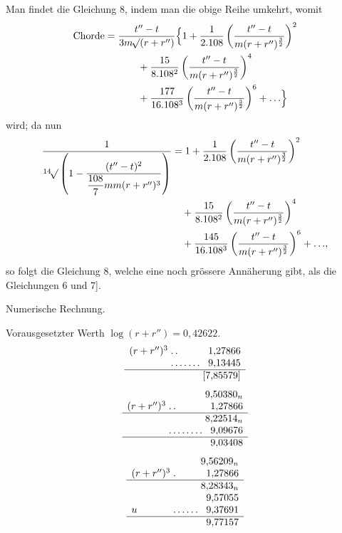 Man findet die Gleichung 8, indem man die obige Reihe umkehrt, womit
\[
\begin{aligned}
\text{Chorde}={}&\frac{t''-t}{3m\BareRoot{(r+r'')}}\Bigl\{1+\frac{1}{2\mathord{.}108}\left(\frac{t''-t}{m(r+r'')^{\frac{3}{2}}}\right)^2\\
&\qquad{}+\frac{15}{8\mathord{.}108^2}\left(\frac{t''-t}{m(r+r'')^{\frac{3}{2}}}\right)^4\\
&\qquad{}+\frac{177}{16\mathord{.}108^3}\left(\frac{t''-t}{m(r+r'')^{\frac{3}{2}}}\right)^6+\mathord{.}\,\mathord{.}\,\mathord{.}\Bigr\}
\end{aligned}
\]
wird; da nun
\[
\begin{aligned}
\frac{1}{\BareRoot[14]{\left(1-\dfrac{(t''-t)^2}{\dfrac{108}{7}mm(r+r'')^3}\right)}}
&=1+\frac{1}{2\mathord{.}108}\left(\frac{t''-t}{m(r+r'')^{\frac{3}{2}}}\right)^2\\
&\quad{}+\frac{15}{8\mathord{.}108^2}\left(\frac{t''-t}{m(r+r'')^{\frac{3}{2}}}\right)^4\\
&\quad{}+\frac{145}{16\mathord{.}108^3}\left(\frac{t''-t}{m(r+r'')^{\frac{3}{2}}}\right)^6+\mathord{.}\,\mathord{.}\,\mathord{.},
\end{aligned}
\]
so folgt die Gleichung 8, welche eine noch grössere Annäherung gibt, als die Gleichungen 6 und 7].
\begin{center}Numerische Rechnung.\end{center}
Vorausgesetzter Werth \(\log(r+r'')=0{,}42622\).
\[
\begin{array}{l@{\;}l@{\;}r}
(r+r'')^3&\mathord{.}\,\mathord{.}&1{,}27866\\
&\mathord{.}\,\mathord{.}\,\mathord{.}\,\mathord{.}\,\mathord{.}\,\mathord{.}\,\mathord{.}&9{,}13445\\\hline
&&[7{,}85579]
\end{array}
\]
\[
\begin{array}{l@{\;}l@{\;}r}
&&9{,}50380_n\\
(r+r'')^3&\mathord{.}\,\mathord{.}&1{,}27866\\\hline
&&8{,}22514_n\\
&\mathord{.}\,\mathord{.}\,\mathord{.}\,\mathord{.}\,\mathord{.}\,\mathord{.}\,\mathord{.}\,\mathord{.}&9{,}09676\\\hline
&&9{,}03408
\end{array}
\]
\[
\begin{array}{l@{\;}l@{\;}r}
&&9{,}56209_n\\
(r+r'')^3&\mathord{.}&1{,}27866\\\hline
&&8{,}28343_n\\
&&9{,}57055\\
u&\mathord{.}\,\mathord{.}\,\mathord{.}\,\mathord{.}\,\mathord{.}\,\mathord{.}&9{,}37691\\\hline
&&9{,}77157
\end{array}
\]
